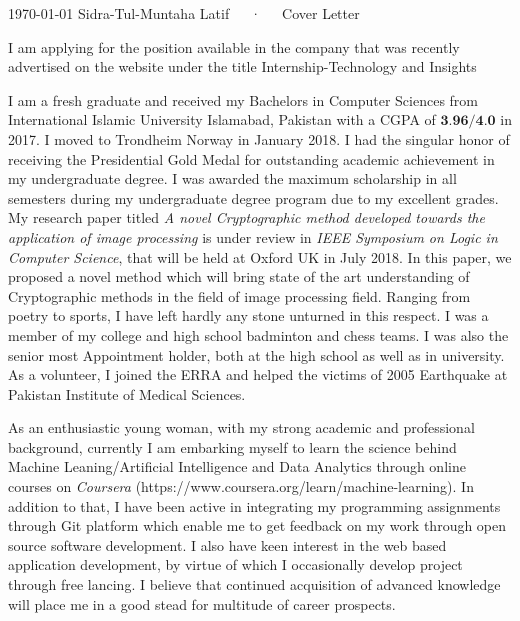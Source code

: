 \documentclass[11pt, a4paper]{awesome-cv}
\begin{document}
	
	\makecvheader
	
	\makecvfooter
	{\today}
	{Sidra-Tul-Muntaha Latif~~~·~~~Cover Letter}
	{}
	
	\makelettertitle
	
	\begin{cvletter}
		
		
		I am applying for the position available in the company that was recently advertised on the website under the title Internship-Technology and Insights
		
		I am a fresh graduate and received my Bachelors in Computer Sciences from International Islamic University Islamabad, Pakistan with a CGPA of $\textbf{3.96/4.0}$ in 2017. I moved to Trondheim Norway in January 2018. 
 I had the singular honor of receiving the Presidential Gold Medal for outstanding academic achievement in my undergraduate degree. I was awarded the maximum scholarship in all semesters during my undergraduate degree program due to my excellent grades. My research paper titled \emph{A novel Cryptographic method developed towards the application of image processing} is under review in \emph{IEEE Symposium on Logic in Computer Science}, that will be held at Oxford UK in July 2018. In this paper, we proposed a novel method which will bring state of the art understanding of Cryptographic methods in the field of image processing field.  Ranging from poetry to sports, I have left hardly any stone unturned in this respect. I was a member of my college and high school badminton and chess teams. I was also the senior most Appointment holder, both at the high school as well as in university. As a volunteer, I joined the ERRA and helped the victims of 2005 Earthquake at Pakistan Institute of Medical Sciences.
 
 As an enthusiastic young woman, with my strong academic and professional background, currently I am embarking myself to learn the science behind Machine Leaning/Artificial Intelligence and Data Analytics through online courses on \emph{Coursera} (https://www.coursera.org/learn/machine-learning). In addition to that, I have been active in integrating my programming assignments through Git platform which enable me to get feedback on my work through open source software development. I also have keen interest in the web based application development, by virtue of which I occasionally develop project through free lancing. I  believe that continued acquisition of advanced knowledge will place me in a good stead for multitude of career prospects. 


\end{cvletter}
\end{document}
